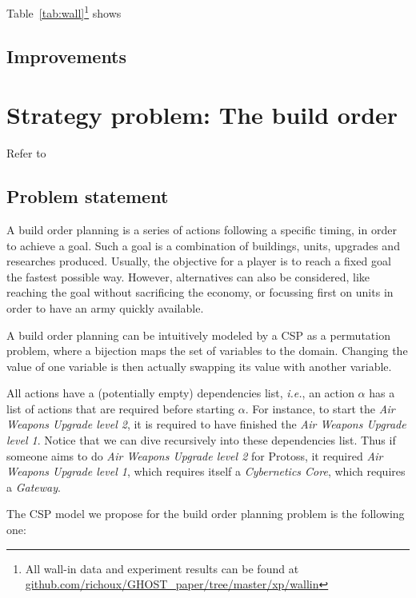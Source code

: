 \documentclass[journal]{IEEEtran}
\newcommand{\csp}{\textsc{CSP}\xspace}
\newcommand{\ie}{\textit{i.e.}}
\begin{document}
Table~\ref{tab:wall}\footnote{All wall-in data  and experiment results
  can                   be                  found                   at
  \href{https://github.com/richoux/GHOST\_paper/tree/master/xp/wallin}{github.com/richoux/GHOST\_paper/tree/master/xp/wallin}}
shows

\subsection{Improvements}


\section{Strategy problem: The build order}\label{sec:bo}
Refer to \cite{ChurchillB11, KuchemPR13, WeberM09, ChoKC13, Blackford14} 
\subsection{Problem statement}
A build  order planning is  a series  of actions following  a specific
timing, in order  to achieve a goal.  Such a goal is  a combination of
buildings,  units,  upgrades  and researches  produced.  Usually,  the
objective for a  player is to reach a fixed  goal the fastest possible
way. However, alternatives  can also be considered,  like reaching the
goal without sacrificing  the economy, or focussing first  on units in
order to have an army quickly available.

A  build order  planning can  be intuitively  modeled by  a \csp  as a
permutation problem,  where a bijection  maps the set of  variables to
the  domain. Changing  the  value  of one  variable  is then  actually
swapping its value with another variable.

All  actions have  a (potentially  empty) dependencies  list, \ie,  an
action  $\alpha$  has a  list  of  actions  that are  required  before
starting  $\alpha$.  For  instance, to  start the  \textit{Air Weapons
  Upgrade level  2}, it is  required to have finished  the \textit{Air
  Weapons Upgrade level  1}. Notice that we can  dive recursively into
these  dependencies  list. Thus  if  someone  aims to  do  \textit{Air
  Weapons  Upgrade  level  2}  for Protoss,  it  required  \textit{Air
  Weapons    Upgrade   level    1},    which    requires   itself    a
\textit{Cybernetics Core}, which requires a \textit{Gateway}.

The \csp model we propose for  the build order planning problem is the
following one:
\end{document}
